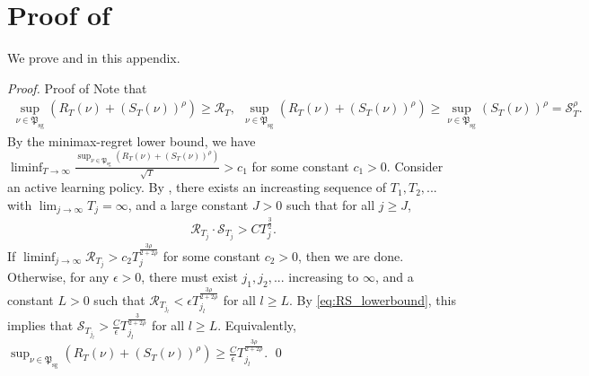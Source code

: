 \documentclass[nonblindrev]{informs3_noinforms}
\begin{document}
\section{Proof of }\label{app:sampling_instability}
We prove  and  in this appendix.
\begin{proof}{Proof of }
    Note that
    \begin{align*}
        \sup_{\nu\in\mathfrak{P}_{\mathrm{sg}}}\left(R_T(\nu)+(S_T(\nu))^\rho\right)\geq \mathcal R_T, \ \ \sup_{\nu\in\mathfrak{P}_{\mathrm{sg}}}\left(R_T(\nu)+(S_T(\nu))^\rho\right)\geq\sup_{\nu\in\mathfrak{P}_{\mathrm{sg}}}(S_T(\nu))^\rho=\mathcal S_T^\rho.
    \end{align*}
    By the minimax-regret lower bound, we have $\liminf_{T\rightarrow\infty}\frac{\sup_{\nu\in\mathfrak{P}_{\mathrm{sg}}}\left(R_T(\nu)+(S_T(\nu))^\rho\right)}{\sqrt{T}}>c_1$ for some constant $c_1>0$. Consider an active learning policy. By , there exists an increasting sequence of $T_1,T_2,...$ with $\lim_{j\rightarrow\infty}T_j=\infty$, and a large constant $J>0$ such that for all $j\geq J$,
    \begin{align}\label{eq:RS_lowerbound}
        \mathcal R_{T_j}\cdot\mathcal S_{T_j}>CT_{j}^{\frac{3}{2}}.
    \end{align}
    If $\liminf_{j\rightarrow\infty}\mathcal R_{T_j}>c_2T_j^{\frac{3\rho}{2+2\rho}}$ for some constant $c_2>0$, then we are done. Otherwise, for any $\epsilon>0$, there must exist $j_1,j_2,...$ increasing to $\infty$, and a constant $L>0$ such that $\mathcal R_{T_{j_l}}<\epsilon T_{j_l}^{\frac{3\rho}{2+2\rho}}$ for all $l\geq L$. By \eqref{eq:RS_lowerbound}, this implies that $\mathcal S_{T_{j_l}}>\frac{C}{\epsilon}T_{j_l}^{\frac{3}{2+2\rho}}$ for all $l\geq L$. Equivalently, $\sup_{\nu\in\mathfrak{P}_{\mathrm{sg}}}\left(R_T(\nu)+(S_T(\nu))^\rho\right)\geq \frac{C}{\epsilon}T_{j_l}^{\frac{3\rho}{2+2\rho}}$. \qed
\end{proof}
\end{document}

